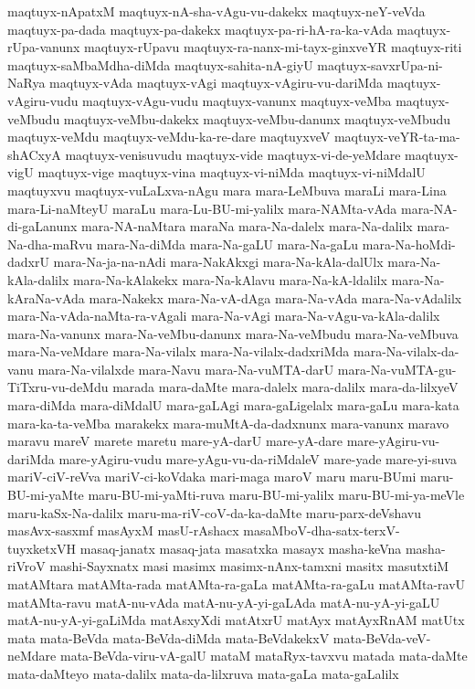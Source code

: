 {maqtuyx-nApatxM
maqtuyx-nA-sha-vAgu-vu-dakekx
maqtuyx-neY-veVda
maqtuyx-pa-dada
maqtuyx-pa-dakekx
maqtuyx-pa-ri-hA-ra-ka-vAda
maqtuyx-rUpa-vanunx
maqtuyx-rUpavu
maqtuyx-ra-nanx-mi-tayx-ginxveYR
maqtuyx-riti
maqtuyx-saMbaMdha-diMda
maqtuyx-sahita-nA-giyU
maqtuyx-savxrUpa-ni-NaRya
maqtuyx-vAda
maqtuyx-vAgi
maqtuyx-vAgiru-vu-dariMda
maqtuyx-vAgiru-vudu
maqtuyx-vAgu-vudu
maqtuyx-vanunx
maqtuyx-veMba
maqtuyx-veMbudu
maqtuyx-veMbu-dakekx
maqtuyx-veMbu-danunx
maqtuyx-veMbudu
maqtuyx-veMdu
maqtuyx-veMdu-ka-re-dare
maqtuyxveV
maqtuyx-veYR-ta-ma-shACxyA
maqtuyx-venisuvudu
maqtuyx-vide
maqtuyx-vi-de-yeMdare
maqtuyx-vigU
maqtuyx-vige
maqtuyx-vina
maqtuyx-vi-niMda
maqtuyx-vi-niMdalU
maqtuyxvu
maqtuyx-vuLaLxva-nAgu
mara
mara-LeMbuva
maraLi
mara-Lina
mara-Li-naMteyU
maraLu
mara-Lu-BU-mi-yalilx
mara-NAMta-vAda
mara-NA-di-gaLanunx
mara-NA-naMtara
maraNa
mara-Na-dalelx
mara-Na-dalilx
mara-Na-dha-maRvu
mara-Na-diMda
mara-Na-gaLU
mara-Na-gaLu
mara-Na-hoMdi-dadxrU
mara-Na-ja-na-nAdi
mara-NakAkxgi
mara-Na-kAla-dalUlx
mara-Na-kAla-dalilx
mara-Na-kAlakekx
mara-Na-kAlavu
mara-Na-kA-ldalilx
mara-Na-kAraNa-vAda
mara-Nakekx
mara-Na-vA-dAga
mara-Na-vAda
mara-Na-vAdalilx
mara-Na-vAda-naMta-ra-vAgali
mara-Na-vAgi
mara-Na-vAgu-va-kAla-dalilx
mara-Na-vanunx
mara-Na-veMbu-danunx
mara-Na-veMbudu
mara-Na-veMbuva
mara-Na-veMdare
mara-Na-vilalx
mara-Na-vilalx-dadxriMda
mara-Na-vilalx-da-vanu
mara-Na-vilalxde
mara-Navu
mara-Na-vuMTA-darU
mara-Na-vuMTA-gu-TiTxru-vu-deMdu
marada
mara-daMte
mara-dalelx
mara-dalilx
mara-da-lilxyeV
mara-diMda
mara-diMdalU
mara-gaLAgi
mara-gaLigelalx
mara-gaLu
mara-kata
mara-ka-ta-veMba
marakekx
mara-muMtA-da-dadxnunx
mara-vanunx
maravo
maravu
mareV
marete
maretu
mare-yA-darU
mare-yA-dare
mare-yAgiru-vu-dariMda
mare-yAgiru-vudu
mare-yAgu-vu-da-riMdaleV
mare-yade
mare-yi-suva
mariV-ciV-reVva
mariV-ci-koVdaka
mari-maga
maroV
maru
maru-BUmi
maru-BU-mi-yaMte
maru-BU-mi-yaMti-ruva
maru-BU-mi-yalilx
maru-BU-mi-ya-meVle
maru-kaSx-Na-dalilx
maru-ma-riV-coV-da-ka-daMte
maru-parx-deVshavu
masAvx-sasxmf
masAyxM
masU-rAshacx
masaMboV-dha-satx-terxV-tuyxketxVH
masaq-janatx
masaq-jata
masatxka
masayx
masha-keVna
masha-riVroV
mashi-Sayxnatx
masi
masimx
masimx-nAnx-tamxni
masitx
masutxtiM
matAMtara
matAMta-rada
matAMta-ra-gaLa
matAMta-ra-gaLu
matAMta-ravU
matAMta-ravu
matA-nu-vAda
matA-nu-yA-yi-gaLAda
matA-nu-yA-yi-gaLU
matA-nu-yA-yi-gaLiMda
matAsxyXdi
matAtxrU
matAyx
matAyxRnAM
matUtx
mata
mata-BeVda
mata-BeVda-diMda
mata-BeVdakekxV
mata-BeVda-veV-neMdare
mata-BeVda-viru-vA-galU
mataM
mataRyx-tavxvu
matada
mata-daMte
mata-daMteyo
mata-dalilx
mata-da-lilxruva
mata-gaLa
mata-gaLalilx
}
